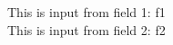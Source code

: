 \documentclass[12pt, a4]{article}
\begin{document}
This is input from field 1: {{f1}}\\
This is input from field 2: {{f2}}


\begin{Form}[action={}]
\end{Form}
\end{document}
